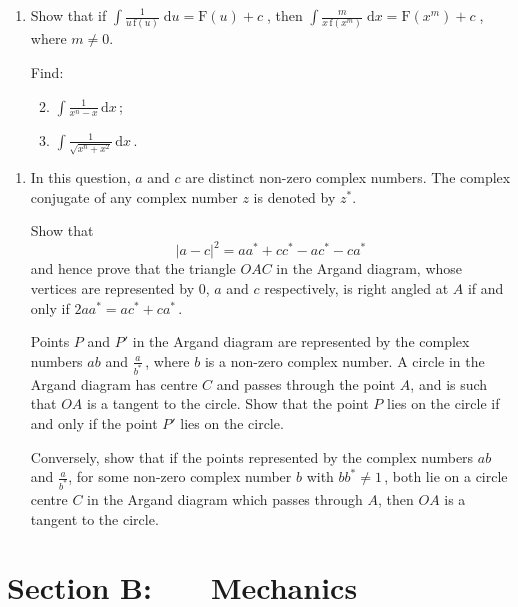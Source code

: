 \documentclass[a4, 11pt]{report}
\newlength{\qspace}
\newcounter{qnumber}
\newenvironment{question}%
 {\vspace{\qspace}
  \begin{enumerate}[\bfseries 1\quad][10]%
    \setcounter{enumi}{\value{qnumber}}%
    \item%
 }
{
  \end{enumerate}
  \filbreak
  \stepcounter{qnumber}
 }
\newenvironment{questionparts}[1][1]%
 {
  \begin{enumerate}[\bfseries (i)]%
    \setcounter{enumii}{#1}
    \addtocounter{enumii}{-1}
    \setlength{\itemsep}{5mm}
    \setlength{\parskip}{8pt}
 }
 {
  \end{enumerate}
 }
\def\d{{\mathrm d}}
\def\f{{\mathrm f}}
\def\F{{\mathrm F}}
\newcommand{\ds}{\displaystyle}
\begin{document}
\begin{question}
Show  that if  
$\ds \int\frac1{u \, \f(u)}\; \d u  = \F(u) + c\;$,  
then $\ds \int\frac{m}{x \, \f(x^m)} \;\d x = \F(x^m) + c\;$, 
where $m\ne0$.

 
Find:  
\begin{questionparts} 
\item $\ds \int\frac1{x^n-x} \, \d x\,$; 
\item $\ds \int\frac1 {\sqrt{x^n+x^2}}\, \d x\,$. 
\end{questionparts} 
\end{question}
		
\begin{question}	
In this question, $a$ and $c$ are distinct non-zero complex numbers.  
The complex conjugate of any complex number $z$ is denoted by  
$z^*$. 
 
Show that  
\[ 
|a - c|^2 = aa^* + cc^* -ac^* - ca^* 
\] 
and hence prove that the triangle  
$OAC$ in the Argand diagram,  
whose vertices are represented by  
$0$, $a$ and $c$ respectively, is right angled at $A$  
if and only if $2aa^* = ac^*+ca^*\,$. 
 
Points $P$ and $P'$ in the Argand diagram  
are represented by the complex numbers $ab$ and  
$\ds \frac{a}{b^*}\,$, where $b$ is a non-zero complex number.  
A circle in the Argand diagram has centre $C$ and passes through the point $A$,
 and is such that $OA$ is a tangent to the circle.
Show that  the point $P$ lies on the circle  
if and only if the point $P'$ lies on the circle.  

 
Conversely, show that if the points represented  
by the complex numbers $ab$ and $\ds \frac{a}{b^*}$,  
for some non-zero complex number $b$ with $bb^* \ne 1\,$,  
both lie on a circle centre $C$ in the Argand diagram  
which passes through $A$, then $OA$ is a tangent to the circle.  
\end{question}	
		

		
	
\newpage
\section*{Section B: \ \ \ Mechanics}
\end{document}
